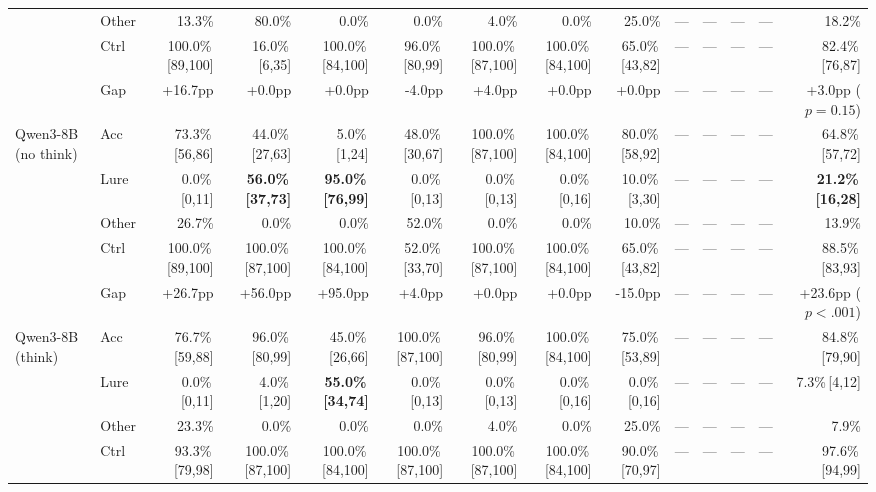 \begin{table}[t]
{\begin{tabular}{l l r r r r r r r r r r r r}
 & Other & 13.3\% & 80.0\% & 0.0\% & 0.0\% & 4.0\% & 0.0\% & 25.0\% & --- & --- & --- & --- & 18.2\% \\
 & Ctrl & 100.0\%\,{\tiny [89,100]} & 16.0\%\,{\tiny [6,35]} & 100.0\%\,{\tiny [84,100]} & 96.0\%\,{\tiny [80,99]} & 100.0\%\,{\tiny [87,100]} & 100.0\%\,{\tiny [84,100]} & 65.0\%\,{\tiny [43,82]} & --- & --- & --- & --- & 82.4\%\,{\tiny [76,87]} \\
 & Gap & +16.7pp & +0.0pp & +0.0pp & -4.0pp & +4.0pp & +0.0pp & +0.0pp & --- & --- & --- & --- & +3.0pp ($p = 0.15$) \\
\midrule
Qwen3-8B {\small(no think)} & Acc & 73.3\%\,{\tiny [56,86]} & 44.0\%\,{\tiny [27,63]} & 5.0\%\,{\tiny [1,24]} & 48.0\%\,{\tiny [30,67]} & 100.0\%\,{\tiny [87,100]} & 100.0\%\,{\tiny [84,100]} & 80.0\%\,{\tiny [58,92]} & --- & --- & --- & --- & 64.8\%\,{\tiny [57,72]} \\
 & Lure & 0.0\%\,{\tiny [0,11]} & \textbf{56.0\%\,{\tiny [37,73]}} & \textbf{95.0\%\,{\tiny [76,99]}} & 0.0\%\,{\tiny [0,13]} & 0.0\%\,{\tiny [0,13]} & 0.0\%\,{\tiny [0,16]} & 10.0\%\,{\tiny [3,30]} & --- & --- & --- & --- & \textbf{21.2\%\,{\tiny [16,28]}} \\
 & Other & 26.7\% & 0.0\% & 0.0\% & 52.0\% & 0.0\% & 0.0\% & 10.0\% & --- & --- & --- & --- & 13.9\% \\
 & Ctrl & 100.0\%\,{\tiny [89,100]} & 100.0\%\,{\tiny [87,100]} & 100.0\%\,{\tiny [84,100]} & 52.0\%\,{\tiny [33,70]} & 100.0\%\,{\tiny [87,100]} & 100.0\%\,{\tiny [84,100]} & 65.0\%\,{\tiny [43,82]} & --- & --- & --- & --- & 88.5\%\,{\tiny [83,93]} \\
 & Gap & +26.7pp & +56.0pp & +95.0pp & +4.0pp & +0.0pp & +0.0pp & -15.0pp & --- & --- & --- & --- & +23.6pp ($p < .001$) \\
\midrule
Qwen3-8B {\small(think)} & Acc & 76.7\%\,{\tiny [59,88]} & 96.0\%\,{\tiny [80,99]} & 45.0\%\,{\tiny [26,66]} & 100.0\%\,{\tiny [87,100]} & 96.0\%\,{\tiny [80,99]} & 100.0\%\,{\tiny [84,100]} & 75.0\%\,{\tiny [53,89]} & --- & --- & --- & --- & 84.8\%\,{\tiny [79,90]} \\
 & Lure & 0.0\%\,{\tiny [0,11]} & 4.0\%\,{\tiny [1,20]} & \textbf{55.0\%\,{\tiny [34,74]}} & 0.0\%\,{\tiny [0,13]} & 0.0\%\,{\tiny [0,13]} & 0.0\%\,{\tiny [0,16]} & 0.0\%\,{\tiny [0,16]} & --- & --- & --- & --- & 7.3\%\,{\tiny [4,12]} \\
 & Other & 23.3\% & 0.0\% & 0.0\% & 0.0\% & 4.0\% & 0.0\% & 25.0\% & --- & --- & --- & --- & 7.9\% \\
 & Ctrl & 93.3\%\,{\tiny [79,98]} & 100.0\%\,{\tiny [87,100]} & 100.0\%\,{\tiny [84,100]} & 100.0\%\,{\tiny [87,100]} & 100.0\%\,{\tiny [87,100]} & 100.0\%\,{\tiny [84,100]} & 90.0\%\,{\tiny [70,97]} & --- & --- & --- & --- & 97.6\%\,{\tiny [94,99]} \\

\end{tabular}}
\end{table}

